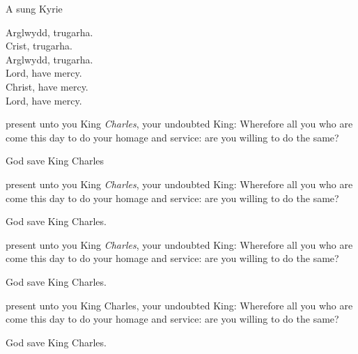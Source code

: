 {\vfill

{A sung Kyrie}

\begin{center}

Arglwydd, trugarha.\\
Crist, trugarha.\\
Arglwydd, trugarha.\\
Lord, have mercy.\\
Christ, have mercy.\\
Lord, have mercy.\\
\end{center}


\vfill
\clearpage



 present unto you
King \textit{Charles}, your undoubted King:
Wherefore all you who are come this day
to do your homage and service:
are you willing to do the same?
\vfill 

God save King Charles
\vfill 






 present unto you
King \textit{Charles}, your undoubted King:
Wherefore all you who are come this day
to do your homage and service:
are you willing to do the same?


God save King Charles.
\vfill


 present unto you
King \textit{Charles}, your undoubted King:
Wherefore all you who are come this day
to do your homage and service:
are you willing to do the same?


God save King Charles.


\vfill 
{}

 present unto you
King Charles, your undoubted King:
Wherefore all you who are come this day
to do your homage and service:
are you willing to do the same?


God save King Charles.


\vfill 




}
